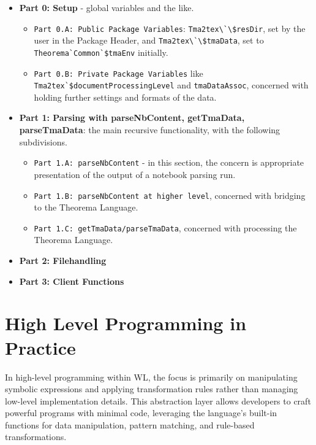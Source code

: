\begin{itemize}
    \item \textbf{Part 0: Setup} - global variables and the like.
    \begin{itemize}
        \item \texttt{Part 0.A: Public Package Variables}: \lstinline+Tma2tex\`\$resDir+, set by the user in the Package Header, and \lstinline+Tma2tex\`\$tmaData+, set to \lstinline+Theorema`Common`$tmaEnv+ initially.
        \item \texttt{Part 0.B: Private Package Variables} like \lstinline+Tma2tex`$documentProcessingLevel+ and \lstinline+tmaDataAssoc+, concerned with holding further settings and formats of the data.
    \end{itemize}
    
    \item \textbf{Part 1: Parsing with parseNbContent, getTmaData, parseTmaData}: the main recursive functionality, with the following subdivisions.   
    \begin{itemize}
        \item \texttt{Part 1.A: parseNbContent} - in this section, the concern is appropriate presentation of the output of a notebook parsing run. 
        \item \texttt{Part 1.B: parseNbContent at higher level}, concerned with bridging to the Theorema Language.
        \item \texttt{Part 1.C: getTmaData/parseTmaData}, concerned with processing the Theorema Language.
    \end{itemize}
    
    \item \textbf{Part 2: Filehandling}
    \begin{itemize}
        
    \end{itemize}

    \item \textbf{Part 3: Client Functions}
    \begin{itemize}
        
    \end{itemize}
\end{itemize}

\section{High Level Programming in Practice}

In high-level programming within WL, the focus is primarily on manipulating symbolic expressions and applying transformation rules rather than managing low-level implementation details. This abstraction layer allows developers to craft powerful programs with minimal code, leveraging the language's built-in functions for data manipulation, pattern matching, and rule-based transformations. 

